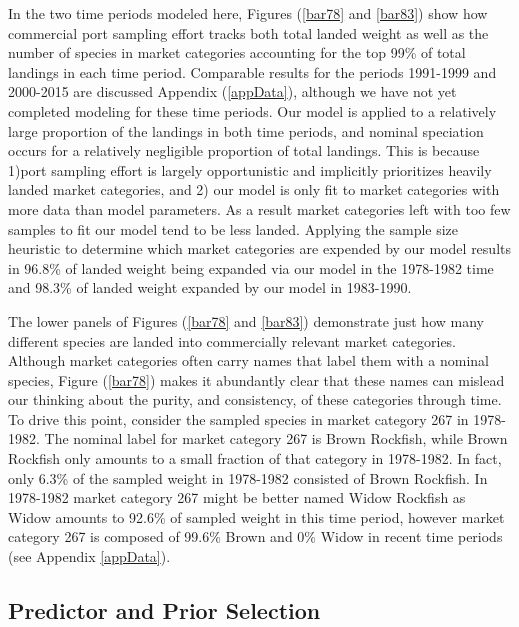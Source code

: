 \documentclass[12pt]{article}
\begin{document}
In the two time periods modeled here, Figures (\ref{bar78} and \ref{bar83}) 
show how commercial port sampling effort tracks both total landed weight as
well as the number of species in market categories accounting for the
top 99\% of total landings in each time period. Comparable results for
the periods 1991-1999 and 2000-2015 are discussed Appendix (\ref{appData}), 
although we have not yet completed modeling for these time periods. 
Our model is applied to a relatively large proportion of the landings in both 
time periods, and nominal speciation occurs for a relatively negligible 
proportion of total landings. %
This is because 1)port sampling effort is largely opportunistic and implicitly 
prioritizes heavily landed market categories, and 2) our model is only fit to 
market categories with more data than model parameters. As a result market 
categories left with too few samples to fit our model tend to be less landed. 
Applying the sample size heuristic to determine which market categories are 
expended by our model results in 96.8\% of landed weight being expanded via 
our model in the 1978-1982 time and 98.3\% of landed weight expanded by our 
model in 1983-1990.

The lower panels of Figures (\ref{bar78} and \ref{bar83}) demonstrate just how
many different species are landed into commercially relevant market
categories. Although market categories often carry names that label them
with a nominal species, Figure (\ref{bar78}) makes it abundantly clear that
these names can mislead our thinking about the purity, and consistency,
of these categories through time. To drive this point, consider the
sampled species in market category 267 in 1978-1982. The nominal label
for market category 267 is Brown Rockfish, while Brown Rockfish only
amounts to a small fraction of that category in 1978-1982. In fact, only
6.3\% of the sampled weight in 1978-1982 consisted of Brown Rockfish. In
1978-1982 market category 267 might be better named Widow Rockfish as
Widow amounts to 92.6\% of sampled weight in this time period, however
market category 267 is composed of 99.6\% Brown and 0\% Widow in recent
time periods (see Appendix \ref{appData}).

\subsection{Predictor and Prior Selection}\label{predictor-and-prior-selection}
\end{document}
